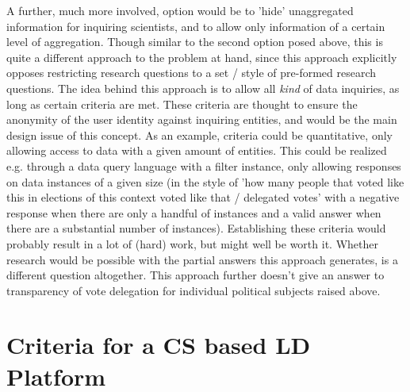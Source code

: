 A further, much more involved, option would be to 'hide' unaggregated information for inquiring scientists, and to allow only information of a certain level of aggregation. Though similar to the second option posed above, this is quite a different approach to the problem at hand, since this approach explicitly opposes restricting research questions to a set / style of pre-formed research questions. The idea behind this approach is to allow all \textit{kind} of data inquiries, as long as certain criteria are met. These criteria are thought to ensure the anonymity of the user identity against inquiring entities, and would be the main design issue of this concept. As an example, criteria could be quantitative, only allowing access to data with a given amount of entities. This could be realized e.g. through a data query language with a filter instance, only allowing responses on data instances of a given size (in the style of 'how many people that voted like this in elections of this context voted like that / delegated votes' with a negative response when there are only a handful of instances and a valid answer when there are a substantial number of instances). Establishing these criteria would probably result in a lot of (hard) work, but might well be worth it. Whether research would be possible with the partial answers this approach generates, is a different question altogether. 
This approach further doesn't give an answer to transparency of vote delegation for individual political subjects raised above.

\section{Criteria for a CS based LD Platform}
\label{sec:Criteria}